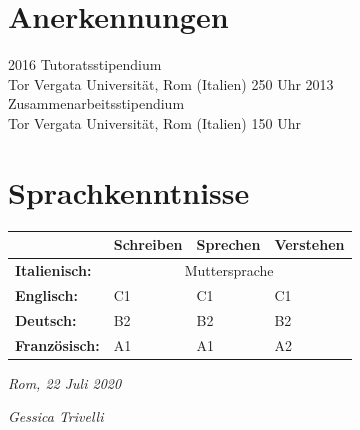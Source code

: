 \documentclass[11pt]{friggeri-cv}
\begin{document}
\section{Anerkennungen}
\begin{entrylist}
  \entry
    {2016}
    {Tutoratsstipendium}
    {\\Tor Vergata Universit\"{a}t, Rom (Italien)}
    {250 Uhr}
  \entry
    {2013}
    {Zusammenarbeitsstipendium}
    {\\Tor Vergata Universit\"{a}t, Rom (Italien)}
    {150 Uhr}
\end{entrylist}


\section{Sprachkenntnisse}
\begin{table}[!h]
  \centering
  \renewcommand{\arraystretch}{1.45}
  \begin{tabular}{ p{3cm} p{3cm} p{3cm} p{3cm} }
    \hline
    & \textbf{Schreiben}       & \textbf{Sprechen} & \textbf{Verstehen}  \\     \hline
    \textbf{Italienisch:}      & \multicolumn{3}{c}{Muttersprache}       \\
    \textbf{Englisch:}         & C1 & C1 & C1                            \\ 
    \textbf{Deutsch:}          & B2 & B2 & B2                            \\ 
    \textbf{Franz\"{o}sisch:}  & A1 & A1 & A2                            \\    \hline
  \end{tabular}
\end{table}



\vspace{100pt}
\begin{flushleft}
\large\emph{Rom, 22 Juli 2020}
\end{flushleft}
\begin{flushright}
\large\emph{Gessica Trivelli}
\end{flushright}
\end{document}
